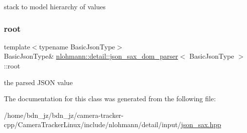 stack to model hierarchy of values 

\mbox{\label{classnlohmann_1_1detail_1_1json__sax__dom__parser_aef0477277389e399d7128898841b71c0}} 
\subsubsection{\texorpdfstring{root}{root}}
{\footnotesize\ttfamily template$<$typename Basic\+Json\+Type$>$ \\
Basic\+Json\+Type\& \hyperlink{classnlohmann_1_1detail_1_1json__sax__dom__parser}{nlohmann\+::detail\+::json\+\_\+sax\+\_\+dom\+\_\+parser}$<$ Basic\+Json\+Type $>$\+::root\hspace{0.3cm}{\ttfamily [private]}}



the parsed J\+S\+ON value 



The documentation for this class was generated from the following file\+:\begin{DoxyCompactItemize}
\item 
/home/bdn\+\_\+jz/bdn\+\_\+jz/camera-\/tracker-\/cpp/\+Camera\+Tracker\+Linux/include/nlohmann/detail/input/\hyperlink{json__sax_8hpp}{json\+\_\+sax.\+hpp}\end{DoxyCompactItemize}
